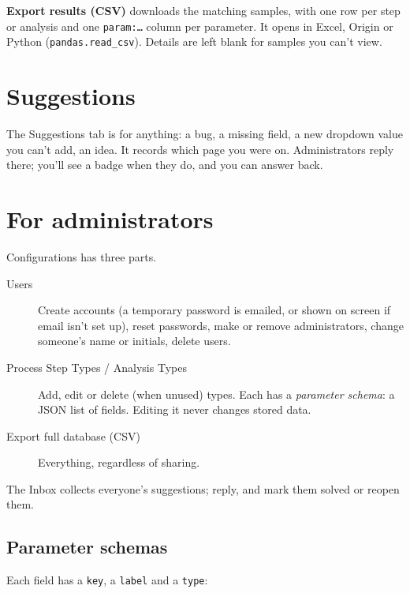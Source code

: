 \documentclass[11pt,a4paper]{article}
\newcommand{\ui}[1]{\textsf{\textbf{#1}}}
\newcommand{\menu}[1]{\textsf{#1}}
\begin{document}
\ui{Export results (CSV)} downloads the matching samples, with one row per
step or analysis and one \texttt{param:\ldots} column per parameter. It
opens in Excel, Origin or Python (\texttt{pandas.read\_csv}). Details are
left blank for samples you can't view.

\section{Suggestions}

The \menu{Suggestions} tab is for anything: a bug, a missing field, a new
dropdown value you can't add, an idea. It records which page you were on.
Administrators reply there; you'll see a badge when they do, and you can
answer back.

\section{For administrators}
\label{sec:admin}

\menu{Configurations} has three parts.

\begin{description}
  \item[Users] Create accounts (a temporary password is emailed, or shown on
    screen if email isn't set up), reset passwords, make or remove
    administrators, change someone's name or initials, delete users.
  \item[Process Step Types / Analysis Types] Add, edit or delete (when
    unused) types. Each has a \emph{parameter schema}: a JSON list of fields.
    Editing it never changes stored data.
  \item[Export full database (CSV)] Everything, regardless of sharing.
\end{description}

The \menu{Inbox} collects everyone's suggestions; reply, and mark them
solved or reopen them.

\subsection{Parameter schemas}

Each field has a \texttt{key}, a \texttt{label} and a \texttt{type}:
\end{document}
